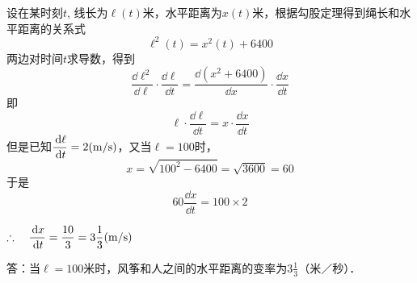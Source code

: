 \begin{solution}
    设在某时刻$t$, 线长为$\ell(t)$米，水平距离为$x(t)$米，根据勾股定理得到绳长和水平距离的关系式
\[\ell^2 (t) =x^2 (t) +6400\]
两边对时间$t$求导数，得到
\[\frac{\dd \ell^2}{\dd \ell}\cdot \frac{\dd \ell}{\dd t}=\frac{\dd(x^2+6400)}{\dd x}\cdot \frac{\dd x}{\dd t}\]
即
\[\ell\cdot \frac{\dd \ell}{\dd t}=x\cdot \frac{\dd x}{\dd t}\]
但是已知$\dfrac{\,{\rm d}\ell}{\,{\rm d} t}=2({\rm m/s})$，又当$\ell=100$时，
\[x=\sqrt{100^2-6400}=\sqrt{3600}=60\]
于是
\[60\frac{\dd x}{\dd t}=100\times 2\]

$\therefore\quad \dfrac{\,{\rm d} x}{\,{\rm d} t}=\dfrac{10}{3}=3\dfrac{1}{3}({\rm m/s})$

答：当$\ell=100$米时，风筝和人之间的水平距离的变率为$3\frac{1}{3}$（米／秒）．
\end{solution}

